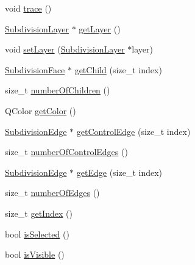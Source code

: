 \begin{DoxyCompactItemize}
\item 
void \hyperlink{classShipCADGeometry_1_1SubdivisionControlFace_a768d000d2891ca110d6eb804abf80351}{trace} ()
\item 
\hyperlink{classShipCADGeometry_1_1SubdivisionLayer}{Subdivision\-Layer} $\ast$ \hyperlink{classShipCADGeometry_1_1SubdivisionControlFace_a2e845cb5e4def22e7efe244ff6a3b168}{get\-Layer} ()
\item 
void \hyperlink{classShipCADGeometry_1_1SubdivisionControlFace_a23631dfffd1c3ad7fc59537a4684fa01}{set\-Layer} (\hyperlink{classShipCADGeometry_1_1SubdivisionLayer}{Subdivision\-Layer} $\ast$layer)
\item 
\hyperlink{classShipCADGeometry_1_1SubdivisionFace}{Subdivision\-Face} $\ast$ \hyperlink{classShipCADGeometry_1_1SubdivisionControlFace_a2c25793e1bed9472121e9126bacac3ce}{get\-Child} (size\-\_\-t index)
\item 
size\-\_\-t \hyperlink{classShipCADGeometry_1_1SubdivisionControlFace_abaa5b8839ae4b8907b4c00d279d3e002}{number\-Of\-Children} ()
\item 
Q\-Color \hyperlink{classShipCADGeometry_1_1SubdivisionControlFace_a8a350fe4fec2ee93228ed9400a6f145c}{get\-Color} ()
\item 
\hyperlink{classShipCADGeometry_1_1SubdivisionEdge}{Subdivision\-Edge} $\ast$ \hyperlink{classShipCADGeometry_1_1SubdivisionControlFace_accfc3e8e3d79a2303126e44e6fdb1728}{get\-Control\-Edge} (size\-\_\-t index)
\item 
size\-\_\-t \hyperlink{classShipCADGeometry_1_1SubdivisionControlFace_a6fd6ad99f4b1af14005936509e5cbbb2}{number\-Of\-Control\-Edges} ()
\item 
\hyperlink{classShipCADGeometry_1_1SubdivisionEdge}{Subdivision\-Edge} $\ast$ \hyperlink{classShipCADGeometry_1_1SubdivisionControlFace_a37af31abc48d84d607c15158ad7c6a2a}{get\-Edge} (size\-\_\-t index)
\item 
size\-\_\-t \hyperlink{classShipCADGeometry_1_1SubdivisionControlFace_a51e9bb7f8223daceba617bdae326b155}{number\-Of\-Edges} ()
\item 
size\-\_\-t \hyperlink{classShipCADGeometry_1_1SubdivisionControlFace_a72f906db976c6530f0f2d4c03701ad15}{get\-Index} ()
\item 
bool \hyperlink{classShipCADGeometry_1_1SubdivisionControlFace_ab56a2d4c3fccb7a578def71d286ee03c}{is\-Selected} ()
\item 
bool \hyperlink{classShipCADGeometry_1_1SubdivisionControlFace_a2a722717e127bac12e3b81f4664fc568}{is\-Visible} ()
\item 

\end{DoxyCompactItemize}
